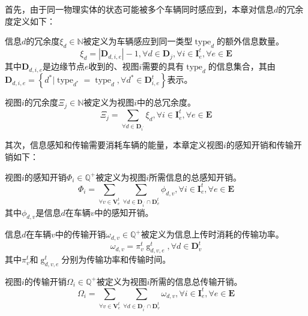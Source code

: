 首先，由于同一物理实体的状态可能被多个车辆同时感应到，本章对信息$d$的冗余度定义如下：
\begin{definition}
信息$d$的冗余度$\xi_d \in \mathbb{N}$被定义为车辆感应到同一类型$\operatorname{type}_d$的额外信息数量。
\begin{equation}
    \xi_d= \left | \mathbf{D}_{d, i, e} \right| - 1, \forall d \in \mathbf{D}_j, \forall i \in \mathbf{I}_{e}^{t}, \forall e \in \mathbf{E}
\end{equation}
\noindent 其中$\mathbf{D}_{d, i, e}$是边缘节点$e$收到的、视图$i$需要的具有$\operatorname{type}_d$的信息集合，其由$\mathbf{D}_{d, i, e}=\left\{ d^* \vert \operatorname{type}_{d^*} = \operatorname{type}_{d}, \forall d^* \in \mathbf{D}_{i, e}^t \right \}$表示。

\end{definition}
\begin{definition}
视图$i$的冗余度$\Xi_j \in \mathbb{N}$被定义为视图$i$中的总冗余度。
	\begin{equation}
       \Xi_j =  \sum_{\forall d \in \mathbf{D}_{i^{\prime}}} \xi_d, \forall i \in \mathbf{I}_{e}^{t}, \forall e \in \mathbf{E}
       \label{equ 4-20}
    \end{equation}
\end{definition}

其次，信息感知和传输需要消耗车辆的能量，本章定义视图$i$的感知开销和传输开销如下：
\begin{definition}
视图$i$的感知开销$\Phi_{i} \in \mathbb{Q}^{+}$被定义为视图$i$所需信息的总感知开销。
	\begin{equation}
        \Phi_{i} = \sum_{\forall v \in \mathbf{V}_{e}^{t}} \sum_{\forall d \in \mathbf{D}_{i^{\prime}} \cap \mathbf{D}_v^t}{\phi_{d, v}}, \forall i \in \mathbf{I}_{e}^t, \forall e \in \mathbf{E}
        \label{equ 4-21}
    \end{equation}
    其中$\phi_{d, v}$是信息$d$在车辆$v$中的感知开销。
\end{definition}
\begin{definition}
信息$d$在车辆$v$中的传输开销${\omega}_{d, v} \in \mathbb{Q}^{+}$被定义为信息上传时消耗的传输功率。
\begin{equation}
    {\omega}_{d, v}= \pi_v^t \operatorname{g}_{d, v, e}^t, \forall d \in \mathbf{D}_v^t
\end{equation}
其中$\pi_v^t$和$\operatorname{g}_{d, v, e}^t$分别为传输功率和传输时间。
\end{definition}
\begin{definition}
视图$i$的传输开销$\Omega_{i} \in \mathbb{Q}^{+}$被定义为视图$i$所需的信息总传输开销。
	\begin{equation}
        \Omega_{i} = \sum_{\forall v \in \mathbf{V}_{e}^{t}} \sum_{\forall d \in \mathbf{D}_{i^{\prime}} \cap \mathbf{D}_v^t} {\omega}_{d, v}, \forall i \in \mathbf{I}_{e}^t, \forall e \in \mathbf{E}
       	\label{equ 4-23}
    \end{equation}
\end{definition}

